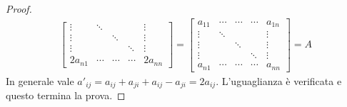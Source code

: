 \begin{proof}
\begin{displaymath}
\begin{split}
\begin{bmatrix}
\vdots & \ddots &		&		& \vdots\\
\vdots &  		& \ddots & 		& \vdots\\
\vdots & 		&		& \ddots & \vdots\\
2a_{n1}& \cdots & \cdots &\cdots & 2a_{nn}
\end{bmatrix} = 
\begin{bmatrix}
a_{11} & \cdots & \cdots &\cdots & a_{1n} \\
\vdots & \ddots &		&		& \vdots\\
\vdots &  		& \ddots & 		& \vdots\\
\vdots & 		&		& \ddots & \vdots\\
a_{n1} & \cdots & \cdots &\cdots & a_{nn}
\end{bmatrix} = A
\end{split}
\end{displaymath}
In generale vale $a'_{ij} = a_{ij} + a_{ji} + a_{ij} - a_{ji} = 2a_{ij}$.
L'uguaglianza \`e verificata e questo termina la prova.
\end{proof}


